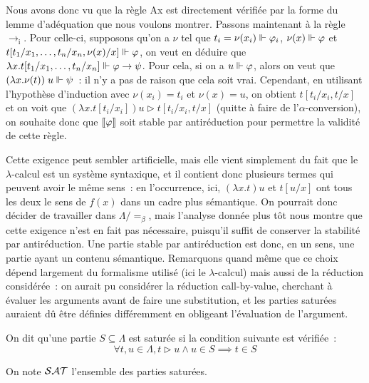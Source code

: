 \documentclass{article}
\begin{document}
Nous avons donc vu que la règle Ax est directement vérifiée par la forme du lemme d'adéquation que nous voulons montrer. Passons maintenant à la règle $\to_\mathrm i$. Pour celle-ci, supposons qu'on a $\nu$ tel que $t_i = \nu(x_i) \Vdash \varphi_i$, $\nu(x) \Vdash \varphi$ et $t[t_1/x_1,\ldots,t_n/x_n, \nu(x)/x]\Vdash \varphi$, on veut en déduire que $\lambda x.t[t_1/x_1,\ldots,t_n/x_n]\Vdash \varphi\to\psi$. Pour cela, si on a $u \Vdash \varphi$, alors on veut que $(\lambda x.\nu(t))\;u\Vdash \psi$~: il n'y a pas de raison que cela soit vrai. Cependant, en utilisant l'hypothèse d'induction avec $\nu(x_i) = t_i$ et $\nu(x) = u$, on obtient $t[t_i/x_i, t/x]$ et on voit que $(\lambda x.t[t_i/x_i])u \rhd t[t_i/x_i, t/x]$ (quitte à faire de l'$\alpha$-conversion), on souhaite donc que $\llbracket \varphi \rrbracket$ soit stable par antiréduction pour permettre la validité de cette règle.

Cette exigence peut sembler artificielle, mais elle vient simplement du fait que le $\lambda$-calcul est un système syntaxique, et il contient donc plusieurs termes qui peuvent avoir le même sens~: en l'occurrence, ici, $(\lambda x.t)u$ et $t[u/x]$ ont tous les deux le sens de $f(x)$ dans un cadre plus sémantique. On pourrait donc décider de travailler dans $\Lambda/=_\beta$, mais l'analyse donnée plus tôt nous montre que cette exigence n'est en fait pas nécessaire, puisqu'il suffit de conserver la stabilité par antiréduction. Une partie stable par antiréduction est donc, en un sens, une partie ayant un contenu sémantique. Remarquons quand même que ce choix dépend largement du formalisme utilisé (ici le $\lambda$-calcul) mais aussi de la réduction considérée~: on aurait pu considérer la réduction call-by-value, cherchant à évaluer les arguments avant de faire une substitution, et les parties saturées auraient dû être définies différemment en obligeant l'évaluation de l'argument.

\begin{defi}
    On dit qu'une partie $S\subseteq \Lambda$ est saturée si la condition suivante est vérifiée~:
    \[\forall t,u\in \Lambda, t \rhd u \land u \in S \implies t \in S\]

    On note $\mathcal {SAT}$ l'ensemble des parties saturées.
\end{defi}
\end{document}

